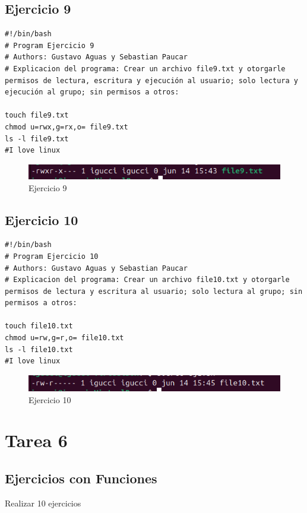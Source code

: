 \documentclass[11pt,twoside]{book}
\begin{document}
\subsection{Ejercicio 9}
\begin{lstlisting}
#!/bin/bash
# Program Ejercicio 9
# Authors: Gustavo Aguas y Sebastian Paucar
# Explicacion del programa: Crear un archivo file9.txt y otorgarle permisos de lectura, escritura y ejecución al usuario; solo lectura y ejecución al grupo; sin permisos a otros:

touch file9.txt
chmod u=rwx,g=rx,o= file9.txt
ls -l file9.txt
#I love linux
\end{lstlisting}
\begin{figure}[h]
    \centering
    \includegraphics[width=1\linewidth]{psimb/ej9.png}
    \caption{Ejercicio 9}
\end{figure}
\newpage
\subsection{Ejercicio 10}

\begin{lstlisting}
#!/bin/bash
# Program Ejercicio 10
# Authors: Gustavo Aguas y Sebastian Paucar
# Explicacion del programa: Crear un archivo file10.txt y otorgarle permisos de lectura y escritura al usuario; solo lectura al grupo; sin permisos a otros:

touch file10.txt
chmod u=rw,g=r,o= file10.txt
ls -l file10.txt
#I love linux
\end{lstlisting}
\begin{figure}[h]
    \centering
    \includegraphics[width=1\linewidth]{psimb/ej10.png}
    \caption{Ejercicio 10}
\end{figure}

\newpage
\section{Tarea 6}
\subsection{Ejercicios con Funciones}
Realizar 10 ejercicios
\end{document}
